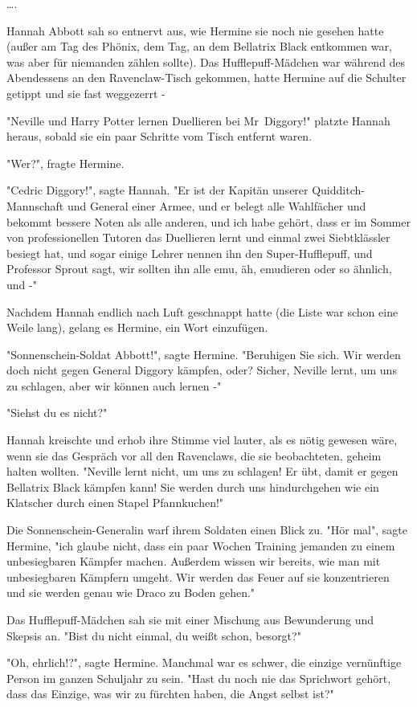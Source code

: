 {….

Hannah Abbott sah so entnervt aus, wie Hermine sie noch nie gesehen hatte (außer am Tag des Phönix, dem Tag, an dem Bellatrix Black entkommen war, was aber für niemanden zählen sollte). Das Hufflepuff-Mädchen war während des Abendessens an den Ravenclaw-Tisch gekommen, hatte Hermine auf die Schulter getippt und sie fast weggezerrt -

"Neville und Harry Potter lernen Duellieren bei Mr~Diggory!" platzte Hannah heraus, sobald sie ein paar Schritte vom Tisch entfernt waren.

"Wer?", fragte Hermine.

"Cedric Diggory!", sagte Hannah. "Er ist der Kapitän unserer Quidditch-Mannschaft und General einer Armee, und er belegt alle Wahlfächer und bekommt bessere Noten als alle anderen, und ich habe gehört, dass er im Sommer von professionellen Tutoren das Duellieren lernt und einmal zwei Siebtklässler besiegt hat, und sogar einige Lehrer nennen ihn den Super-Hufflepuff, und Professor Sprout sagt, wir sollten ihn alle emu, äh, emudieren oder so ähnlich, und -"

Nachdem Hannah endlich nach Luft geschnappt hatte (die Liste war schon eine Weile lang), gelang es Hermine, ein Wort einzufügen.

"Sonnenschein-Soldat Abbott!", sagte Hermine. "Beruhigen Sie sich. Wir werden doch nicht gegen General Diggory kämpfen, oder? Sicher, Neville lernt, um uns zu schlagen, aber wir können auch lernen -"

"Siehst du es nicht?"

Hannah kreischte und erhob ihre Stimme viel lauter, als es nötig gewesen wäre, wenn sie das Gespräch vor all den Ravenclaws, die sie beobachteten, geheim halten wollten. "Neville lernt nicht, um uns zu schlagen! Er übt, damit er gegen Bellatrix Black kämpfen kann! Sie werden durch uns hindurchgehen wie ein Klatscher durch einen Stapel Pfannkuchen!"

Die Sonnenschein-Generalin warf ihrem Soldaten einen Blick zu. "Hör mal", sagte Hermine, "ich glaube nicht, dass ein paar Wochen Training jemanden zu einem unbesiegbaren Kämpfer machen. Außerdem wissen wir bereits, wie man mit unbesiegbaren Kämpfern umgeht. Wir werden das Feuer auf sie konzentrieren und sie werden genau wie Draco zu Boden gehen."

Das Hufflepuff-Mädchen sah sie mit einer Mischung aus Bewunderung und Skepsis an. "Bist du nicht einmal, du weißt schon, besorgt?"

"Oh, ehrlich!?", sagte Hermine. Manchmal war es schwer, die einzige vernünftige Person im ganzen Schuljahr zu sein. "Hast du noch nie das Sprichwort gehört, dass das Einzige, was wir zu fürchten haben, die Angst selbst ist?"

}
